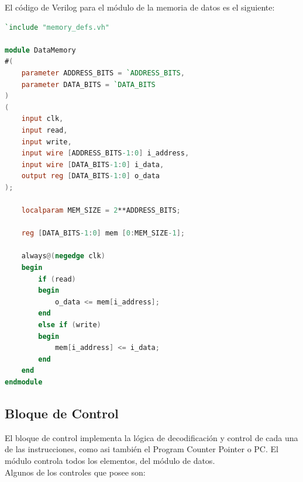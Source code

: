 \documentclass{article}
\begin{document}
El código de Verilog para el módulo de la memoria de datos es el siguiente:

\begin{shaded}
\begin{lstlisting}[language=Verilog]
`include "memory_defs.vh"

module DataMemory
#(
    parameter ADDRESS_BITS = `ADDRESS_BITS,
    parameter DATA_BITS = `DATA_BITS
)
(
    input clk,
    input read,
    input write,
    input wire [ADDRESS_BITS-1:0] i_address,
    input wire [DATA_BITS-1:0] i_data,
    output reg [DATA_BITS-1:0] o_data
);

    localparam MEM_SIZE = 2**ADDRESS_BITS;

    reg [DATA_BITS-1:0] mem [0:MEM_SIZE-1];

    always@(negedge clk)
    begin
        if (read)
        begin
            o_data <= mem[i_address];
        end
        else if (write)
        begin
            mem[i_address] <= i_data;
        end
    end
endmodule
\end{lstlisting}
\end{shaded}

\newpage

\subsection{Bloque de Control}

El bloque de control implementa la lógica de decodificación y control de cada una de las instrucciones,
como asi también el Program Counter Pointer o PC. El módulo controla todos los elementos, del módulo de datos. \\
Algunos de los controles que posee son:
\end{document}
